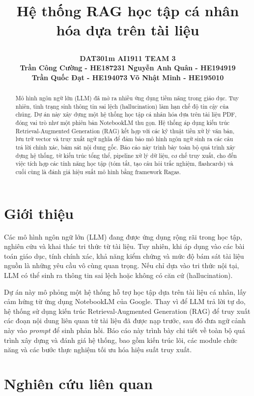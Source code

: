 ﻿\documentclass[12pt]{article}
\title{%
  \parbox[c][\TitleBlockHeight][c]{0.90\textwidth}{%
    \centering
    {\fontsize{18pt}{22pt}\selectfont\bfseries Hệ thống RAG học tập cá nhân hóa dựa trên tài liệu}
  }%
}
\author{%
  \textbf{DAT301m AI1911 TEAM 3}\\
  \vspace{1em}
  \textbf{Trần Công Cường - HE187231} \hspace{2.8em} \textbf{Nguyễn Anh Quân - HE194919}\\
  \vspace{1em}
  \textbf{Trần Quốc Đạt - HE194073 } \hspace{2.8em} \textbf{Võ Nhật Minh - HE195010}
}
\date{}
\begin{document}
\maketitle
\thispagestyle{firstpage}
\vspace{-3em}

\begin{abstract}
\noindent Mô hình ngôn ngữ lớn (LLM) đã mở ra nhiều ứng dụng tiềm năng trong giáo dục. Tuy nhiên, tình trạng sinh thông tin sai lệch (hallucination) làm hạn chế độ tin cậy của chúng. Dự án này xây dựng một hệ thống học tập cá nhân hóa dựa trên tài liệu PDF, đóng vai trò như một phiên bản NotebookLM thu gọn. Hệ thống áp dụng kiến trúc Retrieval-Augmented Generation (RAG) kết hợp với các kỹ thuật tiền xử lý văn bản, lưu trữ vector và truy xuất ngữ nghĩa để đảm bảo mô hình ngôn ngữ sinh ra các câu trả lời chính xác, bám sát nội dung gốc. Báo cáo này trình bày toàn bộ quá trình xây dựng hệ thống, từ kiến trúc tổng thể, pipeline xử lý dữ liệu, cơ chế truy xuất, cho đến việc tích hợp các tính năng học tập (tóm tắt, tạo câu hỏi trắc nghiệm, flashcards) và cuối cùng là đánh giá hiệu suất mô hình bằng framework Ragas.
\end{abstract}

\section{Giới thiệu}
Các mô hình ngôn ngữ lớn (LLM) đang được ứng dụng rộng rãi trong học tập, nghiên cứu và khai thác tri thức từ tài liệu. Tuy nhiên, khi áp dụng vào các bài toán giáo dục, tính chính xác, khả năng kiểm chứng và mức độ bám sát tài liệu nguồn là những yêu cầu vô cùng quan trọng. Nếu chỉ dựa vào tri thức nội tại, LLM có thể sinh ra thông tin sai lệch hoặc không có căn cứ (hallucination).

Dự án này mô phỏng một hệ thống hỗ trợ học tập dựa trên tài liệu cá nhân, lấy cảm hứng từ ứng dụng NotebookLM của Google. Thay vì để LLM trả lời tự do, hệ thống sử dụng kiến trúc Retrieval-Augmented Generation (RAG) để truy xuất các đoạn nội dung liên quan từ tài liệu đã được nạp trước, sau đó đưa ngữ cảnh này vào \textit{prompt} để sinh phản hồi. Báo cáo này trình bày chi tiết về toàn bộ quá trình xây dựng và đánh giá hệ thống, bao gồm kiến trúc lõi, các module chức năng và các bước thực nghiệm tối ưu hóa hiệu suất truy xuất.

\section{Nghiên cứu liên quan}
\end{document}
